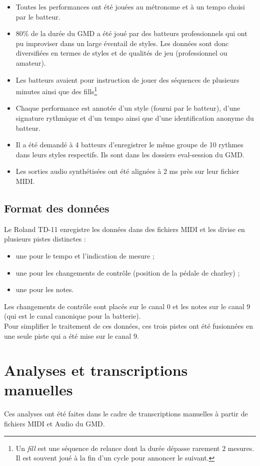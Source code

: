 \begin{itemize}
	\item Toutes les performances ont été jouées au métronome et à un tempo
        choisi par le batteur.
	\item 80\% de la durée du GMD a été joué par des batteurs professionnels
        qui ont pu improviser dans un large éventail de styles. Les données
        sont donc diversifiées en termes de styles et de qualités de jeu
        (professionnel ou amateur).
	\item Les batteurs avaient pour instruction de jouer des séquences de
        plusieurs minutes ainsi que des fills\footnote{Un \textit{fill} est une
        séquence de relance dont la durée dépasse rarement 2 mesures. Il est
        souvent joué à la fin d’un cycle pour annoncer le suivant.}
	\item Chaque performance est annotée d’un style (fourni par le batteur),
        d’une signature rythmique et d’un tempo ainsi que d’une identification
        anonyme du batteur.
	\item Il a été demandé à 4 batteurs d’enregistrer le même groupe de 10
        rythmes dans leurs styles respectifs. Ils sont dans les dossiers
        eval-session du GMD.
	\item Les sorties audio synthétisées ont été alignées à 2 ms près sur leur
        fichier MIDI.
\end{itemize}

\subsection*{Format des données}
Le Roland TD-11 enregistre les données dans des fichiers MIDI et les divise en
plusieurs pistes distinctes :
\begin{itemize}
	\item une pour le tempo et l’indication de mesure ;
	\item une pour les changements de contrôle (position de la pédale de
        charley) ;
	\item une pour les notes.\\
\end{itemize}
Les changements de contrôle sont placés sur le canal 0 et les notes sur le
canal 9 (qui est le canal canonique pour la batterie).\\
Pour simplifier le traitement de ces données, ces trois pistes ont été
fusionnées en une seule piste qui a été mise sur le canal 9.

\section{Analyses et transcriptions manuelles}
\label{analyses_et_TM}
Ces analyses ont été faites dans le cadre de transcriptions manuelles à partir
de fichiers MIDI et Audio du GMD.

